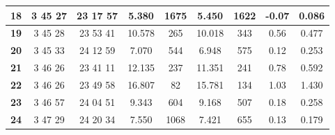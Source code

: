 \documentclass[12pt]{article}
\begin{document}
\begin{table}[H]
{\begin{tabular}{|c|c|c|c|c|c|c|c|c|}
        \textbf{18}   & 3  45  27                                                        & 23  17  57                                                         & 5.380      & 1675                                                       & 5.450      & 1622                                                       & -0.07        & 0.086                                                            \\ \hline
        \textbf{19}   & 3  45  28                                                        & 23  53  41                                                         & 10.578     & 265                                                        & 10.018     & 343                                                        & 0.56         & 0.477                                                            \\ \hline
        \textbf{20}   & 3  45  33                                                        & 24  12  59                                                         & 7.070      & 544                                                        & 6.948      & 575                                                        & 0.12         & 0.253                                                            \\ \hline
        \textbf{21}   & 3  46  26                                                        & 23  41  11                                                         & 12.135     & 237                                                        & 11.351     & 241                                                        & 0.78         & 0.592                                                            \\ \hline
        \textbf{22}   & 3  46  26                                                        & 23  49  58                                                         & 16.807     & 82                                                         & 15.781     & 134                                                        & 1.03         & 1.430                                                            \\ \hline
        \textbf{23}   & 3  46  57                                                        & 24  04  51                                                         & 9.343      & 604                                                        & 9.168      & 507                                                        & 0.18         & 0.258                                                            \\ \hline
        \textbf{24}   & 3  47  29                                                        & 24  20  34                                                         & 7.550      & 1068                                                       & 7.421      & 655                                                        & 0.13         & 0.179                                                            \\ \hline
        \end{tabular}
    }
    \label{tab:1.5}
\end{table}
\end{document}
